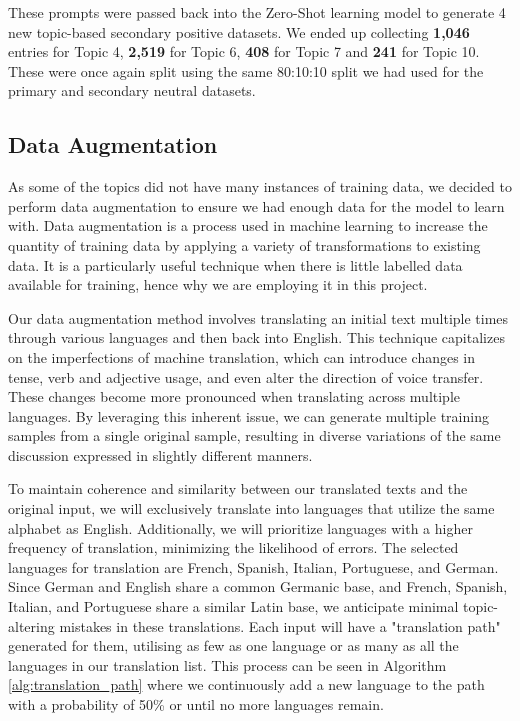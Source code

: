 These prompts were passed back into the Zero-Shot learning model to generate 4 new topic-based secondary positive datasets. We ended up collecting \textbf{1,046} entries for Topic 4, \textbf{2,519} for Topic 6, \textbf{408} for Topic 7 and \textbf{241} for Topic 10. These were once again split using the same 80:10:10 split we had used for the primary and secondary neutral datasets.

\subsection{Data Augmentation}

As some of the topics did not have many instances of training data, we decided to perform data augmentation to ensure we had enough data for the model to learn with. Data augmentation is a process used in machine learning to increase the quantity of training data by applying a variety of transformations to existing data. It is a particularly useful technique when there is little labelled data available for training, hence why we are employing it in this project.

Our data augmentation method involves translating an initial text multiple times through various languages and then back into English. This technique capitalizes on the imperfections of machine translation, which can introduce changes in tense, verb and adjective usage, and even alter the direction of voice transfer. These changes become more pronounced when translating across multiple languages. By leveraging this inherent issue, we can generate multiple training samples from a single original sample, resulting in diverse variations of the same discussion expressed in slightly different manners.

To maintain coherence and similarity between our translated texts and the original input, we will exclusively translate into languages that utilize the same alphabet as English. Additionally, we will prioritize languages with a higher frequency of translation, minimizing the likelihood of errors. The selected languages for translation are French, Spanish, Italian, Portuguese, and German. Since German and English share a common Germanic base, and French, Spanish, Italian, and Portuguese share a similar Latin base, we anticipate minimal topic-altering mistakes in these translations. Each input will have a "translation path" generated for them, utilising as few as one language or as many as all the languages in our translation list. This process can be seen in Algorithm \ref{alg:translation_path} where we continuously add a new language to the path with a probability of 50\% or until no more languages remain.

